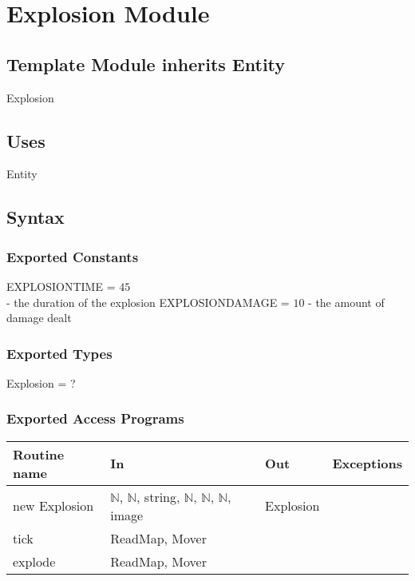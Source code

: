 \documentclass[12pt]{article}
\begin{document}
\newpage

\section*{Explosion Module}

\subsection*{Template Module inherits Entity}

Explosion

\subsection*{Uses}

Entity

\subsection*{Syntax}

\subsubsection*{Exported Constants}

EXPLOSIONTIME = $45$\\ - the duration of the explosion
EXPLOSIONDAMAGE = $10$ - the amount of damage dealt

\subsubsection*{Exported Types}

Explosion = ?

\subsubsection*{Exported Access Programs}

\begin{tabular}{| l | l | l | l |}
\hline
\textbf{Routine name} & \textbf{In} & \textbf{Out} & \textbf{Exceptions}\\
\hline
new Explosion & $\mathbb{N}$, $\mathbb{N}$, string, $\mathbb{N}$, $\mathbb{N}$, $\mathbb{N}$, image & Explosion & ~\\
\hline
tick & ReadMap, Mover & ~ & ~\\
\hline
explode & ReadMap, Mover & ~ & ~\\
\hline
\end{tabular}
\end{document}
